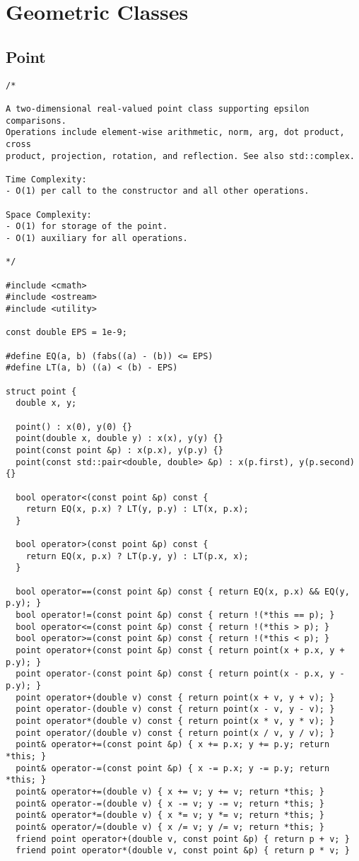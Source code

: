 \section{Geometric Classes}
\setcounter{section}{1}
\setcounter{subsection}{0}
\subsection{Point}
\begin{lstlisting}
/*

A two-dimensional real-valued point class supporting epsilon comparisons.
Operations include element-wise arithmetic, norm, arg, dot product, cross
product, projection, rotation, and reflection. See also std::complex.

Time Complexity:
- O(1) per call to the constructor and all other operations.

Space Complexity:
- O(1) for storage of the point.
- O(1) auxiliary for all operations.

*/

#include <cmath>
#include <ostream>
#include <utility>

const double EPS = 1e-9;

#define EQ(a, b) (fabs((a) - (b)) <= EPS)
#define LT(a, b) ((a) < (b) - EPS)

struct point {
  double x, y;

  point() : x(0), y(0) {}
  point(double x, double y) : x(x), y(y) {}
  point(const point &p) : x(p.x), y(p.y) {}
  point(const std::pair<double, double> &p) : x(p.first), y(p.second) {}

  bool operator<(const point &p) const {
    return EQ(x, p.x) ? LT(y, p.y) : LT(x, p.x);
  }

  bool operator>(const point &p) const {
    return EQ(x, p.x) ? LT(p.y, y) : LT(p.x, x);
  }

  bool operator==(const point &p) const { return EQ(x, p.x) && EQ(y, p.y); }
  bool operator!=(const point &p) const { return !(*this == p); }
  bool operator<=(const point &p) const { return !(*this > p); }
  bool operator>=(const point &p) const { return !(*this < p); }
  point operator+(const point &p) const { return point(x + p.x, y + p.y); }
  point operator-(const point &p) const { return point(x - p.x, y - p.y); }
  point operator+(double v) const { return point(x + v, y + v); }
  point operator-(double v) const { return point(x - v, y - v); }
  point operator*(double v) const { return point(x * v, y * v); }
  point operator/(double v) const { return point(x / v, y / v); }
  point& operator+=(const point &p) { x += p.x; y += p.y; return *this; }
  point& operator-=(const point &p) { x -= p.x; y -= p.y; return *this; }
  point& operator+=(double v) { x += v; y += v; return *this; }
  point& operator-=(double v) { x -= v; y -= v; return *this; }
  point& operator*=(double v) { x *= v; y *= v; return *this; }
  point& operator/=(double v) { x /= v; y /= v; return *this; }
  friend point operator+(double v, const point &p) { return p + v; }
  friend point operator*(double v, const point &p) { return p * v; }


\end{lstlisting}
